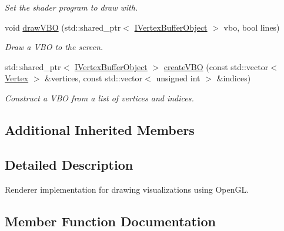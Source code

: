 \begin{DoxyCompactItemize}
\begin{DoxyCompactList}\small\item\em Set the shader program to draw with. \end{DoxyCompactList}\item 
void \hyperlink{class_lots_of_lines_1_1_open_g_l_renderer_a64ec268afbae1693799dd34c3a4a399b}{draw\+V\+BO} (std\+::shared\+\_\+ptr$<$ \hyperlink{class_lots_of_lines_1_1_i_vertex_buffer_object}{I\+Vertex\+Buffer\+Object} $>$ vbo, bool lines)
\begin{DoxyCompactList}\small\item\em Draw a V\+BO to the screen. \end{DoxyCompactList}\item 
std\+::shared\+\_\+ptr$<$ \hyperlink{class_lots_of_lines_1_1_i_vertex_buffer_object}{I\+Vertex\+Buffer\+Object} $>$ \hyperlink{class_lots_of_lines_1_1_open_g_l_renderer_abf57938c51b34029efeac5c18f340213}{create\+V\+BO} (const std\+::vector$<$ \hyperlink{struct_lots_of_lines_1_1_vertex}{Vertex} $>$ \&vertices, const std\+::vector$<$ unsigned int $>$ \&indices)\hypertarget{class_lots_of_lines_1_1_open_g_l_renderer_abf57938c51b34029efeac5c18f340213}{}\label{class_lots_of_lines_1_1_open_g_l_renderer_abf57938c51b34029efeac5c18f340213}

\begin{DoxyCompactList}\small\item\em Construct a V\+BO from a list of vertices and indices. \end{DoxyCompactList}\end{DoxyCompactItemize}
\subsection*{Additional Inherited Members}


\subsection{Detailed Description}
Renderer implementation for drawing visualizations using Open\+GL. 

\subsection{Member Function Documentation}
